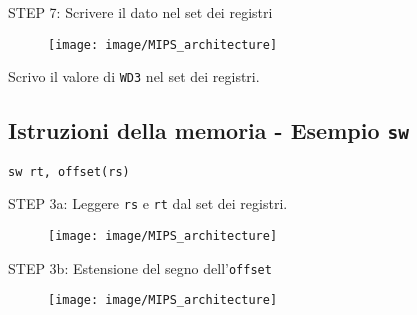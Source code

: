 \documentclass[../main.tex]{subfiles}
\begin{document}
    \vspace*{3mm}

    \begin{adjustwidth}{1cm}{1cm}
        STEP 7: Scrivere il dato nel set dei registri \\

        \begin{figure}[h!]
            \centering

            \vspace*{5mm}
            \hspace*{1cm} \texttt{[image: image/MIPS\_architecture]}
            \vspace*{5mm}
        \end{figure}

        \noindent
        Scrivo il valore di \texttt{WD3} nel set dei registri.
    \end{adjustwidth}

    \newpage

    \subsection*{Istruzioni della memoria - Esempio \texttt{sw}}
    \texttt{sw rt, offset(rs)}
    \vspace*{1.5mm}

    \begin{adjustwidth}{1cm}{1cm}
        STEP 3a: Leggere \texttt{rs} e \texttt{rt} dal set dei registri. \\
        
        \begin{figure}[h!]
            \centering

            \vspace*{5mm}
            \hspace*{1cm} \texttt{[image: image/MIPS\_architecture]}
            \vspace*{5mm}
        \end{figure}
    \end{adjustwidth}

    \vspace*{3mm}

    \begin{adjustwidth}{1cm}{1cm}
        STEP 3b: Estensione del segno dell'\texttt{offset} \\
        
        \begin{figure}[h!]
            \centering

            \vspace*{5mm}
            \hspace*{1cm} \texttt{[image: image/MIPS\_architecture]}
            \vspace*{5mm}
        \end{figure}
    \end{adjustwidth}
\end{document}
